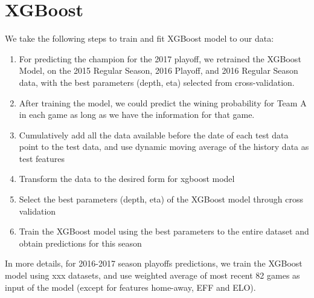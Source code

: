 \section{XGBoost}

We take the following steps to train and fit XGBoost model to our data: 
\begin{enumerate}
	\item For predicting the champion for the 2017 playoff, we retrained the
	    XGBoost Model, on the 2015 Regular Season, 2016 Playoff, and 2016
	    Regular Season data, with the best parameters (depth, eta) selected 
	    from cross-validation. 
	\item After training the model, we could predict the wining probability
	    for Team A in each game as long as we have the information for that game.
	\item Cumulatively add all the data available before the date of each test
	    data point to the test data, and use dynamic moving average of the 
	    history data as test features
	\item Transform the data to the desired form for xgboost model
	\item Select the best parameters (depth, eta) of the XGBoost model through
	    cross validation
	\item Train the XGBoost model using the best parameters to the entire
	    dataset and obtain predictions for this season
\end{enumerate}


In more details, for 2016-2017 season playoffs predictions, we train the XGBoost
model using xxx datasets, and use weighted average of most recent 82 games as 
input of the model (except for features home-away, EFF and ELO).
